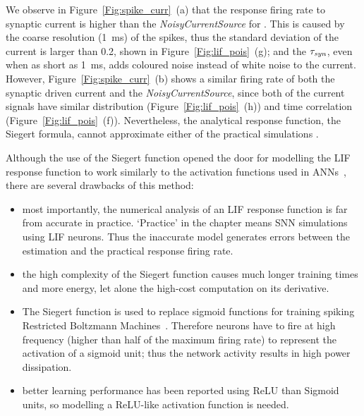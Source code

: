 	We observe in Figure~\ref{Fig:spike_curr}~(a) that the response firing rate to synaptic current is higher than the \textit{NoisyCurrentSource} for \DIFdelbegin {}\DIFdelend \DIFaddbegin {}\DIFaddend .
	This is caused by the coarse resolution (1~ms) of the spikes, thus the standard deviation of the current is larger than 0.2, shown in Figure~\ref{Fig:lif_pois}~(g);
	and the $\tau_{\textit{\textrm{syn}}}$, even when as short as 1~ms, adds coloured noise instead of white noise to the current.
	However, Figure~\ref{Fig:spike_curr}~(b) shows a similar firing rate of both the synaptic driven current and the \textit{NoisyCurrentSource}, since both of the current signals have similar distribution (Figure~\ref{Fig:lif_pois}~(h)) and time correlation (Figure~\ref{Fig:lif_pois}~(f)).
	Nevertheless, the analytical response function, the Siegert formula, cannot approximate either of the practical simulations \DIFaddbegin {}\DIFaddend .

		Although the use of the Siegert function opened the door for modelling the LIF response function to work similarly to the activation functions used in ANNs~\citep{Jug_etal_2012}, there are several drawbacks of this method:
	 \begin{itemize} 
		\item most importantly, the numerical analysis of an LIF response function is far from accurate in practice. `Practice' in the chapter means SNN simulations using LIF neurons.
		Thus the inaccurate model generates errors between the estimation and the practical response firing rate.

		
		\item the high complexity of the Siegert function causes much longer training times and more energy, let alone the high-cost computation on its derivative.
		\item The Siegert function is used to replace sigmoid functions for training spiking Restricted Boltzmann Machines~\DIFaddbegin {}\DIFaddend \citep{Jug_etal_2012}.
		Therefore neurons have to fire at high frequency (higher than half of the maximum firing rate) to represent the activation of a sigmoid unit; thus the network activity results in high power dissipation.
		\item better learning performance has been reported using ReLU than Sigmoid units, so modelling \DIFaddbegin {}\DIFaddend a ReLU-like activation function \DIFdelbegin {}\DIFdelend is needed.  
	 \end{itemize} 

